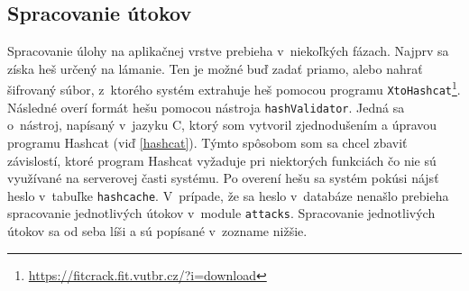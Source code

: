 \documentclass[zadani,slovak]{fitthesis}
\begin{document}
\subsection{Spracovanie útokov}
Spracovanie úlohy na aplikačnej vrstve prebieha v~niekoľkých fázach. Najprv sa získa heš určený na lámanie. Ten je možné buď zadať priamo, alebo nahrať šifrovaný súbor, z~ktorého systém extrahuje heš pomocou programu \texttt{XtoHashcat}\footnote{\url{https://fitcrack.fit.vutbr.cz/?i=download}}. Následné overí formát hešu pomocou nástroja \texttt{hashValidator}. Jedná sa o~nástroj, napísaný v~jazyku C, ktorý som vytvoril zjednodušením a úpravou programu Hashcat (viď \ref{hashcat}). Týmto spôsobom som sa chcel zbaviť závislostí, ktoré program Hashcat vyžaduje pri niektorých funkciách čo nie sú využívané na serverovej časti systému. Po overení hešu sa systém pokúsi nájsť heslo v~tabuľke \texttt{hashcache}. V~prípade, že sa heslo v~databáze nenašlo prebieha spracovanie jednotlivých útokov v~module \texttt{attacks}. Spracovanie jednotlivých útokov sa od seba líši a sú popísané v~zozname nižšie.
\end{document}
